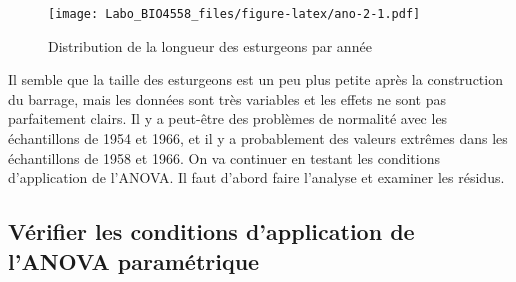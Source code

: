 \documentclass[12pt,]{book}
\newenvironment{Shaded}{\begin{snugshade}}{\end{snugshade}}
\newcommand{\CommentTok}[1]{\textcolor[rgb]{0.37,0.37,0.37}{\textit{#1}}}
\newcommand{\DataTypeTok}[1]{\textcolor[rgb]{0.27,0.27,0.27}{#1}}
\newcommand{\DecValTok}[1]{\textcolor[rgb]{0.06,0.06,0.06}{#1}}
\newcommand{\FloatTok}[1]{\textcolor[rgb]{0.06,0.06,0.06}{#1}}
\newcommand{\KeywordTok}[1]{\textcolor[rgb]{0.27,0.27,0.27}{\textbf{#1}}}
\newcommand{\NormalTok}[1]{#1}
\newcommand{\OperatorTok}[1]{\textcolor[rgb]{0.43,0.43,0.43}{\textbf{#1}}}
\newcommand{\StringTok}[1]{\textcolor[rgb]{0.5,0.5,0.5}{#1}}
\begin{document}
\begin{Shaded}
\end{Shaded}

\begin{figure}
\centering
\texttt{[image: Labo\_BIO4558\_files/figure-latex/ano-2-1.pdf]}
\caption{\label{fig:ano-2}Distribution de la longueur des esturgeons par année}
\end{figure}

Il semble que la taille des esturgeons est un peu plus petite après la construction du barrage, mais les données sont très variables et les effets ne sont pas parfaitement clairs. Il y a peut-être des problèmes de normalité avec les échantillons de 1954 et 1966, et il y a probablement des valeurs extrêmes dans les échantillons de 1958 et 1966. On va continuer en testant les conditions d'application de l'ANOVA. Il faut d'abord faire l'analyse et examiner les résidus.

\hypertarget{vuxe9rifier-les-conditions-dapplication-de-lanova-paramuxe9trique}{%
\subsection{Vérifier les conditions d'application de l'ANOVA paramétrique}\label{vuxe9rifier-les-conditions-dapplication-de-lanova-paramuxe9trique}}
\end{document}
